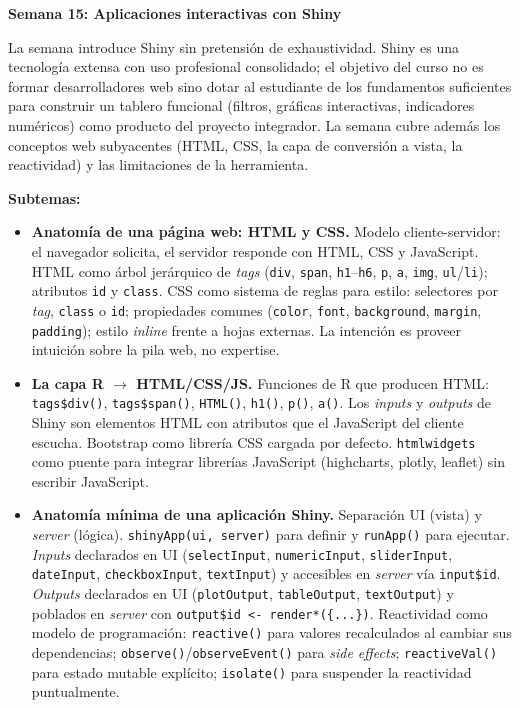 \documentclass[11pt,letterpaper]{article}
\newcommand{\semana}[2]{%
  \bigskip%
  {\color{main}\Large\bfseries Semana #1: #2\par}%
  \smallskip%
}
\begin{document}
\semana{15}{Aplicaciones interactivas con Shiny}

La semana introduce Shiny sin pretensión de exhaustividad. Shiny es una tecnología extensa con uso profesional consolidado; el objetivo del curso no es formar desarrolladores web sino dotar al estudiante de los fundamentos suficientes para construir un tablero funcional (filtros, gráficas interactivas, indicadores numéricos) como producto del proyecto integrador. La semana cubre además los conceptos web subyacentes (HTML, CSS, la capa de conversión a vista, la reactividad) y las limitaciones de la herramienta.

\textbf{Subtemas:}

\begin{itemize}[leftmargin=*, itemsep=2pt]
    \item \textbf{Anatomía de una página web: HTML y CSS.} Modelo cliente-servidor: el navegador solicita, el servidor responde con HTML, CSS y JavaScript. HTML como árbol jerárquico de \textit{tags} (\texttt{div}, \texttt{span}, \texttt{h1}--\texttt{h6}, \texttt{p}, \texttt{a}, \texttt{img}, \texttt{ul}/\texttt{li}); atributos \texttt{id} y \texttt{class}. CSS como sistema de reglas para estilo: selectores por \textit{tag}, \texttt{class} o \texttt{id}; propiedades comunes (\texttt{color}, \texttt{font}, \texttt{background}, \texttt{margin}, \texttt{padding}); estilo \textit{inline} frente a hojas externas. La intención es proveer intuición sobre la pila web, no expertise.
    \item \textbf{La capa R $\to$ HTML/CSS/JS.} Funciones de R que producen HTML: \texttt{tags\$div()}, \texttt{tags\$span()}, \texttt{HTML()}, \texttt{h1()}, \texttt{p()}, \texttt{a()}. Los \textit{inputs} y \textit{outputs} de Shiny son elementos HTML con atributos que el JavaScript del cliente escucha. Bootstrap como librería CSS cargada por defecto. \texttt{htmlwidgets} como puente para integrar librerías JavaScript (highcharts, plotly, leaflet) sin escribir JavaScript.
    \item \textbf{Anatomía mínima de una aplicación Shiny.} Separación UI (vista) y \textit{server} (lógica). \texttt{shinyApp(ui, server)} para definir y \texttt{runApp()} para ejecutar. \textit{Inputs} declarados en UI (\texttt{selectInput}, \texttt{numericInput}, \texttt{sliderInput}, \texttt{dateInput}, \texttt{checkboxInput}, \texttt{textInput}) y accesibles en \textit{server} vía \texttt{input\$id}. \textit{Outputs} declarados en UI (\texttt{plotOutput}, \texttt{tableOutput}, \texttt{textOutput}) y poblados en \textit{server} con \texttt{output\$id <- render*(\{...\})}. Reactividad como modelo de programación: \texttt{reactive()} para valores recalculados al cambiar sus dependencias; \texttt{observe()}/\texttt{observeEvent()} para \textit{side effects}; \texttt{reactiveVal()} para estado mutable explícito; \texttt{isolate()} para suspender la reactividad puntualmente.

\end{itemize}
\end{document}
